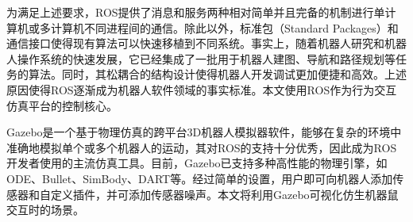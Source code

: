 为满足上述要求，ROS提供了消息和服务两种相对简单并且完备的机制进行单计算机或多计算机不同进程间的通信。除此以外，标准包（Standard Packages）和通信接口使得现有算法可以快速移植到不同系统。事实上，随着机器人研究和机器人操作系统的快速发展，它已经集成了一批用于机器人建图、导航和路径规划等任务的算法。同时，其松耦合的结构设计使得机器人开发调试更加便捷和高效。上述原因使得ROS逐渐成为机器人软件领域的事实标准。本文使用ROS作为行为交互仿真平台的控制核心。

Gazebo是一个基于物理仿真的跨平台3D机器人模拟器软件，能够在复杂的环境中准确地模拟单个或多个机器人的运动，其对ROS的支持十分优秀，因此成为ROS开发者使用的主流仿真工具。目前，Gazebo已支持多种高性能的物理引擎，如ODE、Bullet、SimBody、DART等。经过简单的设置，用户即可向机器人添加传感器和自定义插件，并可添加传感器噪声。本文将利用Gazebo可视化仿生机器鼠交互时的场景。